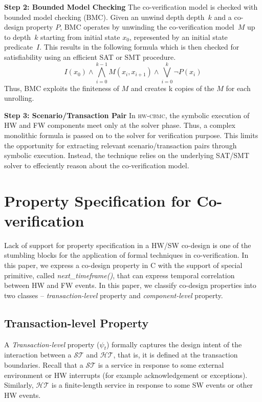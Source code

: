 \documentclass[sigconf]{acmart}
\newcommand{\tool}[1]{\textsc{#1}\xspace}
\newcommand{\hwcbmcv}{\tool{hw-cbmc}}
\newcommand{\Omit}[1]{}
\begin{document}
\textbf{Step 2: Bounded Model Checking}
%
The co-verification model is checked with bounded model checking (BMC).
Given an unwind depth depth~$k$ and a co-design property $P$, BMC operates
by unwinding the co-verification model~$M$ up to depth~$k$ starting from
initial state $x_0$, represented by an initial state predicate~$I$.
This results in the following formula which is then checked for
satisfiability using an efficient SAT or SMT procedure.
%
\[ I(x_0) \wedge \bigwedge_{i=0}^{k-1} M(x_i, x_{i+1}) \wedge \bigvee_{i=0}^{k} 
\neg P(x_i) \]
%
Thus, BMC exploits the finiteness of $M$ and creates k copies of the
$M$ for each unrolling.



\textbf{Step 3: Scenario/Transaction Pair} In \hwcbmcv, the symbolic execution 
of HW and FW components meet only at the solver phase.  Thus, a complex
monolithic formula is passed on to the solver for verification purpose.  This
limits the opportunity for extracting relevant scenario/transaction pairs
through symbolic execution. Instead, the technique relies on the underlying
SAT/SMT solver to effeciently reason about the co-verification model. 
%
\Omit{
The hardware and firmware run independently of each other. 
The communication between them takes place through these function calls. 
}
\section{Property Specification for Co-verification}\label{property}
Lack of support for property specification in a HW/SW co-design is one of the
stumbling blocks for the application of formal techniques in co-verification.  
In this paper, we express a co-design property in C 
with the support of special primitive, called {\em next\_timeframe()}, 
that can express temporal correlation between HW and FW events. 
In this paper, we classify co-design properties into two 
classes -- {\em transaction-level} property and {\em component-level} property.
\subsection{Transaction-level Property}
A {\em Transaction-level} property ($\psi_{t}$) formally captures the 
design intent of the interaction between a $\mathcal{ST}$ and $\mathcal{HT}$, 
that is, it is defined at the transaction boundaries.  
Recall that a $\mathcal{ST}$ is a service in response to some external environment 
or HW interrupts (for example acknowledgement or exceptions). Similarly, 
$\mathcal{HT}$ is a finite-length service in response to some SW events or 
other HW events. 
\end{document}
